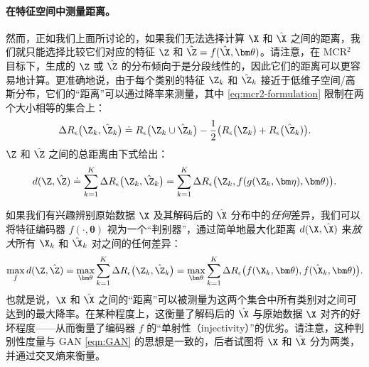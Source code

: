 \documentclass[../../book-main_zh.tex]{subfiles}
\begin{document}
\paragraph{在特征空间中测量距离。}
然而，正如我们上面所讨论的，如果我们无法选择计算 $\X$ 和 $\hat \X$ 之间的距离，我们就只能选择比较它们对应的特征 $\Z$ 和 $\hat \Z =
f(\hat \X, \bm \theta)$。请注意，在 MCR$^2$ 目标下，生成的 $\Z$ 或 $\hat \Z$ 的分布倾向于是分段线性的，因此它们的距离可以更容易地计算。更准确地说，由于每个类别的特征 $\Z_k$ 和 $\hat{\Z}_k$ 接近于低维子空间/高斯分布，它们的“距离”可以通过降率来测量，其中 \eqref{eq:mcr2-formulation} 限制在两个大小相等的集合上：
\begin{equation}
    \Delta R_\epsilon\big(\Z_k, \hat{\Z}_k\big) \doteq
    R_\epsilon\big(\Z_k \cup \hat{\Z}_k\big) - \frac{1}{2} \big(
    R_\epsilon\big(\Z_k) + R_\epsilon\big(\hat \Z_k)\big).
\end{equation}
$\Z$ 和 $\hat \Z$ 之间的总距离由下式给出：
\begin{equation}
    d(\Z, \hat \Z) \doteq   \sum_{k=1}^K \Delta R_\epsilon\big(\Z_k,
    \hat{\Z}_k\big) =  \sum_{k=1}^K \Delta R_\epsilon\big(\Z_k,
    f(g(\Z_k, \bm\eta),\bm \theta)\big).
    \label{eqn:Z-distance}
\end{equation}

如果我们有兴趣辨别原始数据 $\X$ 及其解码后的 $\hat \X$ 分布中的{\em 任何}差异，我们可以将特征编码器 $f(\cdot, \bm \theta)$ 视为一个“判别器”，通过简单地最大化距离 $d(\X, \hat \X)$ 来{\em 放大}所有 $\X_k$ 和 $\hat \X_k$ 对之间的任何差异：
\begin{equation}
    \max_f d(\Z, \hat \Z) = \max_{\bm \theta} \sum_{k=1}^K \Delta
    R_\epsilon\big(\Z_k, \hat{\Z}_k\big) = \max_{\bm \theta}
    \sum_{k=1}^K \Delta R_\epsilon\big(f(\X_k,\bm \theta),
    f(\hat{\X}_k,\bm \theta)\big).
    \label{eqn:max-distance}
\end{equation}
也就是说，$\X$ 和 $\hat \X$ 之间的“距离”可以被测量为这两个集合中所有类别对之间可达到的最大降率。在某种程度上，这衡量了解码后的 $\hat \X$ 与原始数据 $\X$ 对齐的好坏程度——从而衡量了编码器 $f$ 的“单射性（injectivity）”的优劣。请注意，这种判别性度量与 GAN \eqref{eqn:GAN} 的思想是一致的，后者试图将 $\X$ 和 $\hat \X$ 分为两类，并通过交叉熵来衡量。
\end{document}
